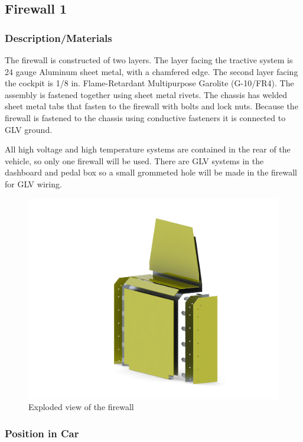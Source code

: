 \documentclass{article}
\begin{document}
    \subsection{Firewall 1}

        \subsubsection{Description/Materials}

            The firewall is constructed of two layers. The layer facing the tractive system is 24 gauge Aluminum sheet metal, with a chamfered edge. The second layer facing the cockpit is 1/8 in. Flame-Retardant Multipurpose Garolite (G-10/FR4). The assembly is fastened together using sheet metal rivets. The chassis has welded sheet metal tabs that fasten to the firewall with bolts and lock nuts. Because the firewall is fastened to the chassis using conductive fasteners it is connected to GLV ground.

            All high voltage and high temperature systems are contained in the rear of the vehicle, so only one firewall will be used. There are GLV systems in the dashboard and pedal box so a small grommeted hole will be made in the firewall for GLV wiring.

            \begin{figure}[H]
                \centering
                \includegraphics[width = 0.6 \textwidth]{ExplodedView}
                \caption{Exploded view of the firewall}
                \label{explodedfirewall}
            \end{figure}

        \subsubsection{Position in Car}
\end{document}
